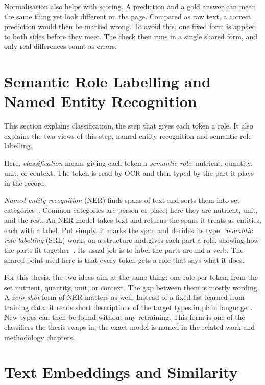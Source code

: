 Normalisation also helps with scoring. A prediction and a gold answer can mean the
same thing yet look different on the page. Compared as raw text, a correct
prediction would then be marked wrong. To avoid this, one fixed form is applied to
both sides before they meet. The check then runs in a single shared form, and only
real differences count as errors.

\section{Semantic Role Labelling and Named Entity Recognition}\label{sec:bgd-ner}

This section explains classification, the step that gives each token a role. It
also explains the two views of this step, named entity recognition and semantic
role labelling.

Here, \emph{classification} means giving each token a \emph{semantic role}:
nutrient, quantity, unit, or context. The token is read by OCR and then typed by
the part it plays in the record.

\emph{Named entity recognition} (NER) finds spans of text and sorts them into set
categories~\cite{li2022nersurvey}. Common categories are person or place; here they
are nutrient, unit, and the rest. An NER model takes text and returns the spans it
treats as entities, each with a label. Put simply, it marks the span and decides
its type. \emph{Semantic role labelling} (SRL) works on a structure and gives each
part a role, showing how the parts fit together~\cite{palmer2010srl}. Its usual job
is to label the parts around a verb. The shared point used here is that every token
gets a role that says what it does.

For this thesis, the two ideas aim at the same thing: one role per token, from the
set nutrient, quantity, unit, or context. The gap between them is mostly wording. A
\emph{zero-shot} form of NER matters as well. Instead of a fixed list learned from
training data, it reads short descriptions of the target types in plain
language~\cite{zaratiana2023gliner}. New types can then be found without any
retraining. This form is one of the classifiers the thesis swaps in; the exact
model is named in the related-work and methodology chapters.

\section{Text Embeddings and Similarity}\label{sec:bgd-embeddings}

